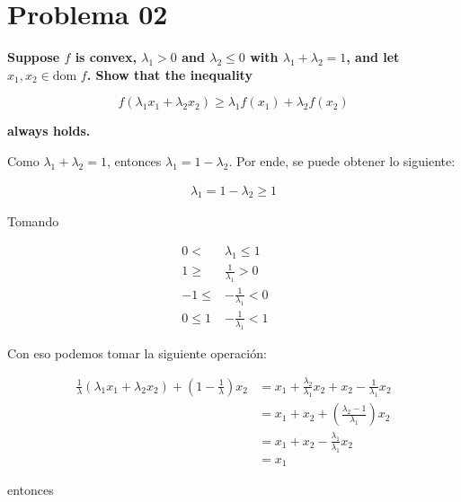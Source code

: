 \section*{Problema 02}

\textbf{Suppose $f$ is convex, $\lambda_1 >0$ and $\lambda_2 \leq 0$ with $\lambda_1 + \lambda_2 =1$, and let $x_1, x_2 \in \text{dom } f$. Show that the inequality}

\begin{equation*}
    f(\lambda_1 x_1 + \lambda_2 x_2) \geq \lambda_1 f(x_1) + \lambda_2 f(x_2)
\end{equation*}

\textbf{always holds.}

Como $\lambda_1 + \lambda_2 = 1$, entonces $\lambda_1 = 1- \lambda_2$. Por ende, se puede obtener lo siguiente:

\begin{align*}
    \lambda_1 = 1- \lambda_2 \geq 1
\end{align*}

Tomando

\begin{align*}
    0 <       & \lambda_1 \leq 1 \qquad   \\
    1 \geq    & \frac{1}{\lambda_1} > 0   \\
    -1 \leq   & -\frac{1}{\lambda_1} < 0  \\
    0 \leq  1 & - \frac{1}{\lambda_1} < 1
\end{align*}

Con eso podemos tomar la siguiente operación:

\begin{align*}
    \frac{1}{\lambda} (\lambda_1 x_1 + \lambda_2 x_2) + \left (1-\frac{1}{\lambda} \right ) x_2 & = x_1 + \frac{\lambda_2}{\lambda_1} x_2 + x_2 - \frac{1}{\lambda_1} x_2 \\
                                                                                                & = x_1 +x_2 + \left (\frac{\lambda_2-1}{\lambda_1} \right ) x_2          \\
                                                                                                & = x_1 +x_2 - \frac{\lambda_1}{\lambda_1} x_2                            \\
                                                                                                & = x_1
\end{align*}

entonces

